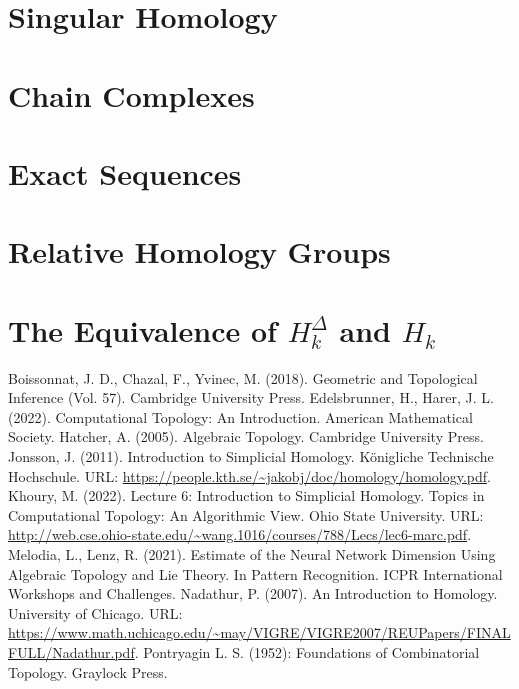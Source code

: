 \documentclass{article}
\begin{document}
\section{Singular Homology}
\section{Chain Complexes}
\section{Exact Sequences}
\section{Relative Homology Groups}
\section{The Equivalence of $H_k^\Delta$ and $H_k$}

\begin{thebibliography}{100}
 Boissonnat, J. D., Chazal, F., Yvinec, M. (2018). Geometric and Topological Inference (Vol. 57). Cambridge University Press.
 Edelsbrunner, H., Harer, J. L. (2022). Computational Topology: An Introduction. American Mathematical Society.
 Hatcher, A. (2005). Algebraic Topology. Cambridge University Press.
 Jonsson, J. (2011). Introduction to Simplicial Homology. Königliche Technische Hochschule. URL: \url{https://people.kth.se/~jakobj/doc/homology/homology.pdf}.
 Khoury, M. (2022). Lecture 6: Introduction to Simplicial Homology. Topics in Computational Topology: An Algorithmic View. Ohio State University. URL: \url{http://web.cse.ohio-state.edu/~wang.1016/courses/788/Lecs/lec6-marc.pdf}.
 Melodia, L., Lenz, R. (2021). Estimate of the Neural Network Dimension Using Algebraic Topology and Lie Theory. In Pattern Recognition. ICPR International Workshops and Challenges.
 Nadathur, P. (2007). An Introduction to Homology. University of Chicago. URL: \url{https://www.math.uchicago.edu/~may/VIGRE/VIGRE2007/REUPapers/FINALFULL/Nadathur.pdf}.
 Pontryagin L. S. (1952): Foundations of Combinatorial Topology. Graylock Press.
\end{thebibliography}
\end{document}
